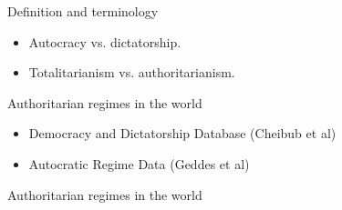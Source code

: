 \documentclass[10pt]{beamer}
\begin{document}
\begin{frame}{Definition and terminology}
	\begin{itemize}
	\item Autocracy vs. dictatorship.
	\item Totalitarianism vs. authoritarianism.
	\end{itemize}
\end{frame}

\begin{frame}{Authoritarian regimes in the world}
	\begin{itemize}
		\item Democracy and Dictatorship Database (Cheibub et al)
		\item Autocratic Regime Data (Geddes et al)
	\end{itemize}
\end{frame}

\begin{frame}{Authoritarian regimes in the world}
	\begin{figure}
	\centering
	\end{figure}
\end{frame}
\end{document}
